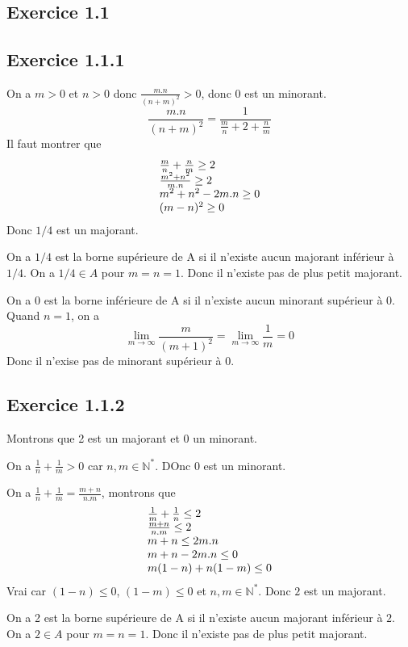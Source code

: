 \documentclass[]{book}
\theoremstyle{definition}
\newcommand{\bb}[1]{\mathbb{#1}}
\newcommand{\N}{\bb{N}}
\begin{document}
\newpage
\subsection*{Exercice 1.1}
\subsection*{Exercice 1.1.1}
On a $m > 0$ et $n >0$ donc $\frac{m.n}{(n+m)^2} > 0$, donc 0 est un minorant. 
$$
\frac{m.n}{(n+m)^2} = \frac{1}{\frac{m}{n}+2+\frac{n}{m}}
$$
Il faut montrer que 
$$
\begin{array}{l l}
\frac{m}{n}+\frac{n}{m} \geq 2 \\
\frac{m^2+n^2}{m.n} \geq 2 \\
m^2+n^2-2m.n \geq 0 \\
(m-n)^2 \geq 0 \\
\end{array}
$$
Donc $1/4$ est un majorant.

On a $1/4$ est la borne sup\'erieure de A si il n'existe aucun majorant inf\'erieur \`a $1/4$. On a $1/4 \in A$ pour $m=n=1$. Donc il n'existe pas de plus petit majorant.

On a 0 est la borne inf\'erieure de A si il n'existe aucun minorant sup\'erieur \`a $0$. Quand $n=1$, on a 
$$\lim_{m \to \infty}\frac{m}{(m+1)^2} = \lim_{m \to \infty}\frac{1}{m} = 0$$
Donc il n'exise pas de minorant sup\'erieur \`a 0.

\subsection*{Exercice 1.1.2}
Montrons que 2 est un majorant et 0 un minorant.

On a $\frac{1}{n}+\frac{1}{m}>0$ car $n,m \in \N^{*}$. DOnc 0 est un minorant.

On a $\frac{1}{n}+\frac{1}{m} = \frac{m+n}{n.m}$, montrons que 
$$
\begin{array}{l l}
\frac{1}{m} +  \frac{1}{n} \leq 2 \\
\frac{m+n}{n.m} \leq 2 \\
m+n \leq 2m.n \\
m+n-2m.n \leq 0 \\
m(1-n)+n(1-m) \leq 0 \\
\end{array}
$$
Vrai car $(1-n) \leq 0$, $(1-m) \leq 0$ et $n,m \in \N^{*}$. Donc $2$ est un majorant.

On a 2 est la borne sup\'erieure de A si il n'existe aucun majorant inf\'erieur \`a $2$. On a $2 \in A$ pour $m=n=1$. Donc il n'existe pas de plus petit majorant.
\end{document}
